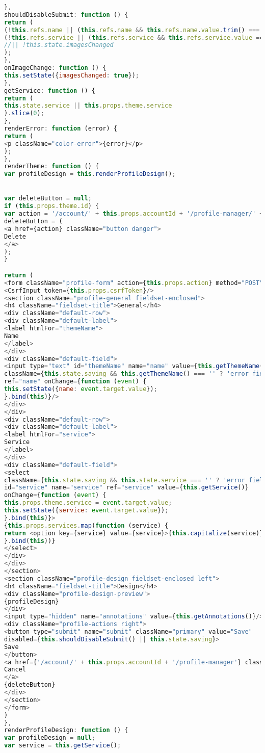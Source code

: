 \begin{lstlisting}[language=javascript]
},
shouldDisableSubmit: function () {
return (
(!this.refs.name || (this.refs.name && this.refs.name.value.trim() === '')) ||
(!this.refs.service || (this.refs.service && this.refs.service.value === ''))
//|| !this.state.imagesChanged
);
},
onImageChange: function () {
this.setState({imagesChanged: true});
},
getService: function () {
return (
this.state.service || this.props.theme.service
).slice(0);
},
renderError: function (error) {
return (
<p className="color-error">{error}</p>
);
},
renderTheme: function () {
var profileDesign = this.renderProfileDesign();


var deleteButton = null;
if (this.props.theme.id) {
var action = '/account/' + this.props.accountId + '/profile-manager/' + this.props.theme.id + '/delete';
deleteButton = (
<a href={action} className="button danger">
Delete
</a>
);
}

return (
<form className="profile-form" action={this.props.action} method="POST" onSubmit={this.onSubmit}>
<CsrfInput token={this.props.csrfToken}/>
<section className="profile-general fieldset-enclosed">
<h4 className="fieldset-title">General</h4>
<div className="default-row">
<div className="default-label">
<label htmlFor="themeName">
Name
</label>
</div>
<div className="default-field">
<input type="text" id="themeName" name="name" value={this.getThemeName()}
className={this.state.saving && this.getThemeName() === '' ? 'error fieldset-input' : 'fieldset-input'}
ref="name" onChange={function (event) {
this.setState({name: event.target.value});
}.bind(this)}/>
</div>
</div>
<div className="default-row">
<div className="default-label">
<label htmlFor="service">
Service
</label>
</div>
<div className="default-field">
<select
className={this.state.saving && this.state.service === '' ? 'error fieldset-input' : 'fieldset-input'}
id="service" name="service" ref="service" value={this.getService()}
onChange={function (event) {
this.props.theme.service = event.target.value;
this.setState({service: event.target.value});
}.bind(this)}>
{this.props.services.map(function (service) {
return <option key={service} value={service}>{this.capitalize(service)}</option>
}.bind(this))}
</select>
</div>
</div>
</section>
<section className="profile-design fieldset-enclosed left">
<h4 className="fieldset-title">Design</h4>
<div className="profile-design-preview">
{profileDesign}
</div>
<input type="hidden" name="annotations" value={this.getAnnotations()}/>
<div className="profile-actions right">
<button type="submit" name="submit" className="primary" value="Save"
disabled={this.shouldDisableSubmit() || this.state.saving}>
Save
</button>
<a href={'/account/' + this.props.accountId + '/profile-manager'} className="button">
Cancel
</a>
{deleteButton}
</div>
</section>
</form>
)
},
renderProfileDesign: function () {
var profileDesign = null;
var service = this.getService();


\end{lstlisting}

